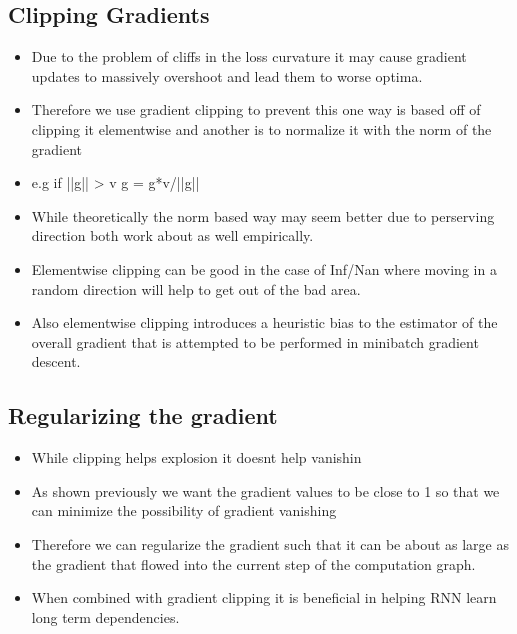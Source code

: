 \documentclass[11pt]{article}
\begin{document}
\subsection{Clipping Gradients}
\label{sec:orgd27fec9}
\begin{itemize}
\item Due to the problem of cliffs in the loss curvature it may cause gradient updates to massively overshoot and lead them to worse optima.
\item Therefore we use gradient clipping to prevent this one way is based off of clipping it elementwise and another is to normalize it with the norm of the gradient
\item e.g if ||g|| > v g = g*v/||g||
\item While theoretically the norm based way may seem better due to perserving direction both work about as well empirically.
\item Elementwise clipping can be good in the case of Inf/Nan where moving in a random direction will help to get out of the bad area.
\item Also elementwise clipping introduces a heuristic bias to the estimator of the overall gradient that is attempted to be performed in minibatch gradient descent.
\end{itemize}
\subsection{Regularizing the gradient}
\label{sec:org4cdc315}
\begin{itemize}
\item While clipping helps explosion it doesnt help vanishin
\item As shown previously we want the gradient values to be close to 1 so that we can minimize the possibility of gradient vanishing
\item Therefore we can regularize the gradient such that it can be about as large as the gradient that flowed into the current step of the computation graph.
\item When combined with gradient clipping it is beneficial in helping RNN learn long term dependencies.
\end{itemize}
\end{document}
